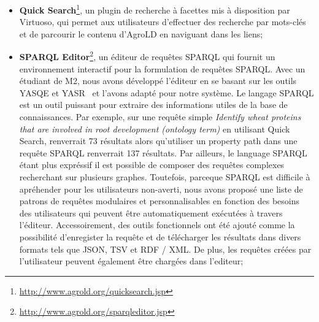 \begin{itemize}
\item  \textbf{Quick Search}\footnote{\url{http://www.agrold.org/quicksearch.jsp}}, un plugin de recherche à facettes mis à disposition par Virtuoso, qui permet aux utilisateurs d'effectuer des recherche par mots-clés et de parcourir le contenu d’AgroLD en naviguant dans les liens;\\
\item \textbf{SPARQL Editor}\footnote{\url{http://www.agrold.org/sparqleditor.jsp}}, un éditeur de requêtes SPARQL qui fournit un environnement interactif pour la formulation de requêtes SPARQL. Avec un étudiant de M2, nous avons développé l'éditeur en se basant sur les outils YASQE et YASR~\cite{yasgui} et l'avons adapté pour notre système. Le langage SPARQL est un outil puissant pour extraire des informations utiles de la base de connaissances. Par exemple, sur une requête simple \textit{Identify wheat proteins that are involved in root development (ontology term)} en utilisant Quick Search, renverrait 73 résultats alors qu'utiliser un property path dans une requête SPARQL renverrait 137 résultats. Par ailleurs, le language SPARQL étant plus expréssif il est possible de composer des requêtes complexes recherchant sur plusieurs graphes. Toutefois, parceque SPARQL est difficile à apréhender pour les utilisateurs non-averti, nous avons proposé une liste de patrons de requêtes modulaires et personnalisables en fonction des besoins des utilisateurs qui peuvent être automatiquement exécutées à travers l'éditeur. Accessoirement, des outils fonctionnels ont été ajouté comme la possibilité d'enregister la requête et de télécharger les résultats dans divers formats tels que JSON, TSV et RDF / XML. De plus, les requêtes créées par l'utilisateur peuvent également être chargées dans l'editeur;\\

\end{itemize}
